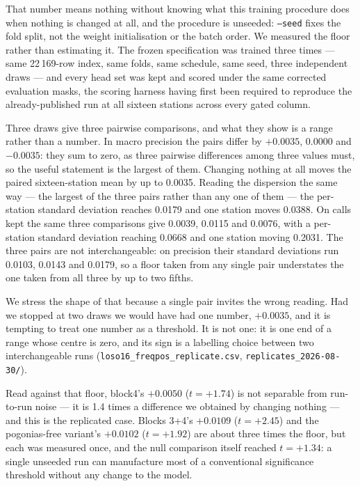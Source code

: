 \documentclass[review,3p,times]{elsarticle}
\begin{document}
That number means nothing without knowing what this training procedure does
when nothing is changed at all, and the procedure is unseeded: \texttt{--seed}
fixes the fold split, not the weight initialisation or the batch order. We
measured the floor rather than estimating it. The frozen specification was
trained three times --- same 22\,169-row index, same folds, same schedule, same
seed, three independent draws --- and every head set was kept and scored under
the same corrected evaluation masks, the scoring harness having first been
required to reproduce the already-published run at all sixteen stations across
every gated column.

Three draws give three pairwise comparisons, and what they show is a range
rather than a number. In macro precision the pairs differ by $+0.0035$,
$0.0000$ and $-0.0035$: they sum to zero, as three pairwise differences among
three values must, so the useful statement is the largest of them. Changing
nothing at all moves the paired sixteen-station mean by up to 0.0035. Reading
the dispersion the same way --- the largest of the three pairs rather than any
one of them --- the per-station standard deviation reaches 0.0179 and one
station moves 0.0388. On calls kept the same three comparisons give 0.0039,
0.0115 and 0.0076, with a per-station standard deviation reaching 0.0668 and
one station moving 0.2031. The three pairs are not interchangeable: on
precision their standard deviations run 0.0103, 0.0143 and 0.0179, so a floor
taken from any single pair understates the one taken from all three by up to
two fifths.

We stress the shape of that because a single pair invites the wrong reading.
Had we stopped at two draws we would have had one number, $+0.0035$, and it is
tempting to treat one number as a threshold. It is not one: it is one end of a
range whose centre is zero, and its sign is a labelling choice between two
interchangeable runs
(\texttt{loso16\_freqpos\_replicate.csv}, \texttt{replicates\_2026-08-30/}).

Read against that floor, block4's $+0.0050$ ($t=+1.74$) is not separable from
run-to-run noise --- it is 1.4 times a difference we obtained by changing
nothing --- and this is the replicated case. Blocks 3+4's $+0.0109$
($t=+2.45$) and the pogonias-free variant's $+0.0102$ ($t=+1.92$) are about
three times the floor, but each was measured once, and the null comparison
itself reached $t = +1.34$: a single unseeded run can manufacture most of a
conventional significance threshold without any change to the model.
\end{document}
